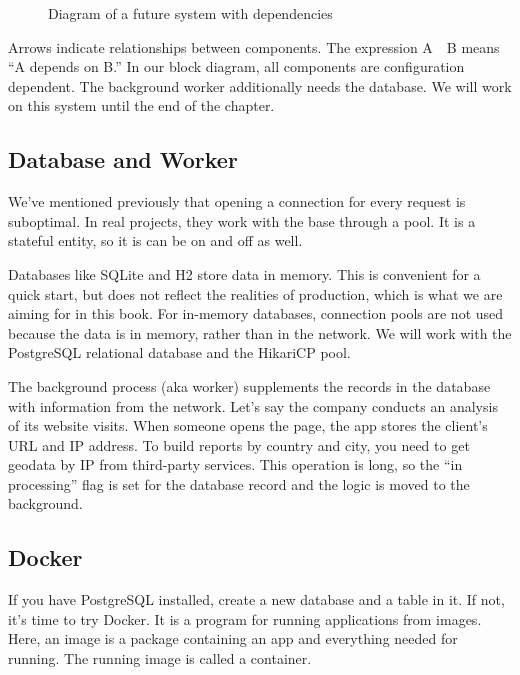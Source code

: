 \begin{figure}[ht!]
  \caption{Diagram of a future system with dependencies}
  \label{fig:chart-system}
\end{figure}

Arrows indicate relationships between components. The expression A~\arr~B means ``A depends on B.'' In our block diagram, all components are configuration dependent. The background worker additionally needs the database. We will work on this system until the end of the chapter.

\subsection{Database and Worker}

We've mentioned previously that opening a connection for every request is suboptimal. In real projects, they work with the base through a pool. It is a stateful entity, so it is can be on and off as well.


Databases like SQLite and H2 store data in memory. This is convenient for a quick start, but does not reflect the realities of production, which is what we are aiming for in this book. For in-memory databases, connection pools are not used because the data is in memory, rather than in the network. We will work with the PostgreSQL relational database and the HikariCP pool.

The background process (aka worker) supplements the records in the database with information from the network. Let's say the company conducts an analysis of its website visits. When someone opens the page, the app stores the client's URL and IP address. To build reports by country and city, you need to get geodata by IP from third-party services. This operation is long, so the ``in processing'' flag is set for the database record and the logic is moved to the background.

\subsection{Docker}


\label{docker-db}

If you have PostgreSQL installed, create a new database and a table in it. If not, it's time to try Docker. It is a program for running applications from images. Here, an image is a package containing an app and everything needed for running. The running image is called a container.

